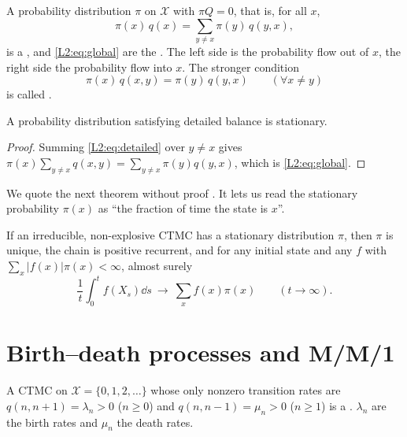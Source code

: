 \begin{definition}\label{L2:def:balance}
A probability distribution $\pi$ on $\mathcal{X}$ with $\pi Q=0$, that is, for all $x$,
\begin{equation}\label{L2:eq:global}
  \pi(x)\,q(x)=\sum_{y\ne x}\pi(y)\,q(y,x),
\end{equation}
is a , and \eqref{L2:eq:global} are the
. The left side is the probability flow out of $x$,
the right side the probability flow into $x$. The stronger condition
\begin{equation}\label{L2:eq:detailed}
  \pi(x)\,q(x,y)=\pi(y)\,q(y,x)\qquad(\forall x\ne y)
\end{equation}
is called .
\end{definition}

\begin{lemma}\label{L2:lem:detailed}
A probability distribution satisfying detailed balance is stationary.
\end{lemma}
\begin{proof}
Summing \eqref{L2:eq:detailed} over $y\ne x$ gives $\pi(x)\sum_{y\ne x}q(x,y)=\sum_{y\ne x}\pi(y)q(y,x)$, which is \eqref{L2:eq:global}.
\end{proof}

We quote the next theorem without proof \cite[Ch.~3]{norris1997}. It lets us read the
stationary probability $\pi(x)$ as ``the fraction of time the state is $x$''.

\begin{theorem}\label{L2:thm:ergodic}
If an irreducible, non-explosive CTMC has a stationary distribution $\pi$, then $\pi$
is unique, the chain is positive recurrent, and for any initial state and any $f$ with
$\sum_x|f(x)|\pi(x)<\infty$, almost surely
\[
  \frac1t\int_0^t f(X_s)\dd s\ \longrightarrow\ \sum_x f(x)\pi(x)\qquad(t\to\infty).
\]
\end{theorem}

\section{Birth--death processes and M/M/1}

\begin{definition}\label{L2:def:bd}
A CTMC on $\mathcal{X}=\{0,1,2,\dots\}$ whose only nonzero transition rates are
$q(n,n+1)=\lambda_n>0$ ($n\ge0$) and $q(n,n-1)=\mu_n>0$ ($n\ge1$) is a
. $\lambda_n$ are the birth rates and $\mu_n$ the death
rates.
\end{definition}

